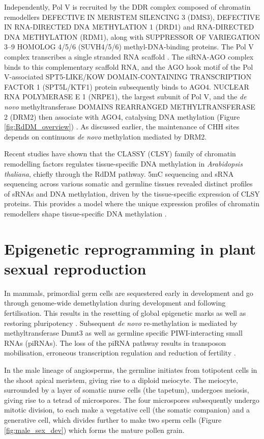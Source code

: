 Independently, Pol V is recruited by the DDR complex composed of chromatin remodellers DEFECTIVE IN MERISTEM SILENCING 3 (DMS3), DEFECTIVE IN RNA-DIRECTED DNA METHYLATION 1 (DRD1) and RNA-DIRECTED DNA METHYLATION (RDM1), along with SUPPRESSOR OF VARIEGATION 3–9 HOMOLOG 4/5/6 (SUVH4/5/6) methyl-DNA-binding proteins. The Pol V complex transcribes a single stranded RNA scaffold \cite{RN33}. The siRNA-AGO complex binds to this complementary scaffold RNA, and the AGO hook motif of the Pol V-associated SPT5-LIKE/KOW DOMAIN-CONTAINING TRANSCRIPTION FACTOR 1 (SPT5L/KTF1) protein subsequently binds to AGO4. NUCLEAR RNA POLYMERASE E 1 (NRPE1), the largest subunit of Pol V, and the \textit{de novo} methyltransferase DOMAINS REARRANGED METHYLTRANSFERASE 2 (DRM2) then associate with AGO4, catalysing DNA methylation (Figure \ref{fig:RdDM_overview})  \cite{RN228,RN121,RN122}. As discussed earlier, the maintenance of CHH sites depends on continuous \textit{de novo} methylation mediated by DRM2.

Recent studies have shown that the CLASSY (CLSY) family of chromatin remodelling factors regulates tissue-specific DNA methylation in \textit{Arabidopsis thaliana}, chiefly through the RdDM pathway. 5mC sequencing and sRNA sequencing across various somatic and germline tissues revealed distinct profiles of sRNAs and DNA methylation, driven by the tissue-specific expression of CLSY proteins. This provides a model where the unique expression profiles of chromatin remodellers shape tissue-specific DNA methylation \cite{RN162}.  


\section{Epigenetic reprogramming in plant sexual reproduction}

In mammals, primordial germ cells are sequestered early in development and go through genome-wide demethylation during development and following fertilisation. This results in the resetting of global epigenetic marks as well as restoring pluripotency \cite{RN210}. Subsequent \textit{de novo} re-methylation is mediated by methyltransferase Dnmt3 as well as germline specific PIWI-interacting small RNAs (piRNAs). The loss of the piRNA pathway results in transposon mobilisation, erroneous transcription regulation and reduction of fertility \cite{RN124,RN125,RN126}.

In the male lineage of angiosperms, the germline initiates from totipotent cells in the shoot apical meristem, giving rise to a diploid meiocyte. The meiocyte, surrounded by a layer of somatic nurse cells (the tapetum), undergoes meiosis, giving rise to a tetrad of microspores. The four microspores subsequently undergo mitotic division, to each make a vegetative cell (the somatic companion) and a generative cell, which divides further to make two sperm cells (Figure \ref{fig:male_sex_dev}) \cite{RN14,RN199} which forms the mature pollen grain. 

